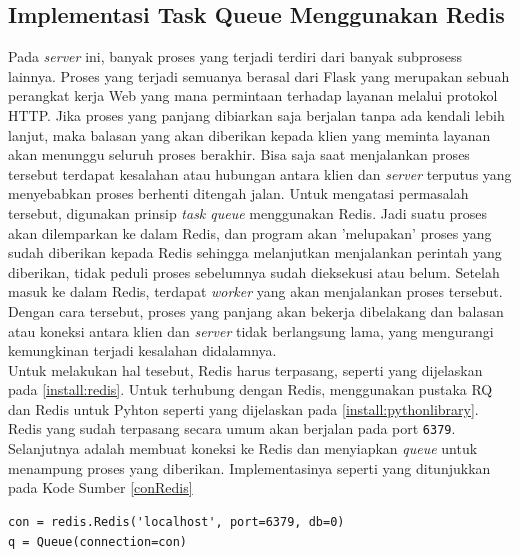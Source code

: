         \subsection{Implementasi Task Queue Menggunakan Redis}
        	Pada \textit{server} ini, banyak proses yang terjadi terdiri dari banyak subprosess lainnya. Proses yang terjadi semuanya berasal dari Flask yang merupakan sebuah perangkat kerja Web yang mana permintaan terhadap layanan melalui protokol HTTP. Jika proses yang panjang dibiarkan saja berjalan tanpa ada kendali lebih lanjut, maka balasan yang akan diberikan kepada klien yang meminta layanan akan menunggu seluruh proses berakhir. Bisa saja saat menjalankan proses tersebut terdapat kesalahan atau hubungan antara klien dan \textit{server} terputus yang menyebabkan proses berhenti ditengah jalan. Untuk mengatasi permasalah tersebut, digunakan prinsip \textit{task queue} menggunakan Redis. Jadi suatu proses akan dilemparkan ke dalam Redis, dan program akan 'melupakan' proses yang sudah diberikan kepada Redis sehingga melanjutkan menjalankan perintah yang diberikan, tidak peduli proses sebelumnya sudah dieksekusi atau belum. Setelah masuk ke dalam Redis, terdapat \textit{worker} yang akan menjalankan proses tersebut. Dengan cara tersebut, proses yang panjang akan bekerja dibelakang dan balasan atau koneksi antara klien dan \textit{server} tidak berlangsung lama, yang mengurangi kemungkinan terjadi kesalahan didalamnya.\\
            \indent Untuk melakukan hal tesebut, Redis harus terpasang, seperti yang dijelaskan pada \ref{install:redis}. Untuk terhubung dengan Redis, menggunakan pustaka RQ dan Redis untuk Pyhton seperti yang dijelaskan pada \ref{install:pythonlibrary}. Redis yang sudah terpasang secara umum akan berjalan pada port \texttt{6379}. Selanjutnya adalah membuat koneksi ke Redis dan menyiapkan \textit{queue} untuk menampung proses yang diberikan. Implementasinya seperti yang ditunjukkan pada Kode Sumber \ref{conRedis}  
        \begin{lstlisting}[frame=single,tabsize=2,breaklines,caption={Koneksi Redis},label=conRedis, captionpos=b]
con = redis.Redis('localhost', port=6379, db=0)
q = Queue(connection=con)
		\end{lstlisting}
        
